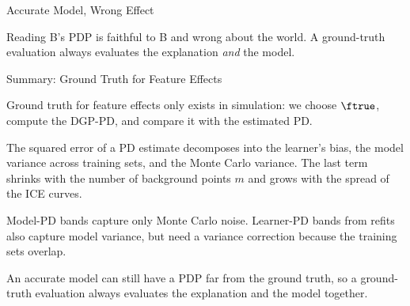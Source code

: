 \documentclass[10pt,compress,t,notes=noshow, xcolor=table, handout]{beamer}
\begin{document}
\begin{framev}[align=mid]{Accurate Model, Wrong Effect}
\spacer[0.4]
\pause
\begin{block}{Reading}
B's PDP is faithful to B and wrong about the world. A ground-truth evaluation always evaluates the explanation \emph{and} the model.
\end{block}
\end{framev}


\begin{framev}[align=mid]{Summary: Ground Truth for Feature Effects}
\begin{itemizeM}
\item Ground truth for feature effects only exists in simulation: we choose $\ftrue$, compute the DGP-PD, and compare it with the estimated PD.
\item The squared error of a PD estimate decomposes into the learner's bias, the model variance across training sets, and the Monte Carlo variance. The last term shrinks with the number of background points $m$ and grows with the spread of the ICE curves.
\item Model-PD bands capture only Monte Carlo noise. Learner-PD bands from refits also capture model variance, but need a variance correction because the training sets overlap.
\item An accurate model can still have a PDP far from the ground truth, so a ground-truth evaluation always evaluates the explanation and the model together.
\end{itemizeM}
\end{framev}


\endlecture
\end{document}
